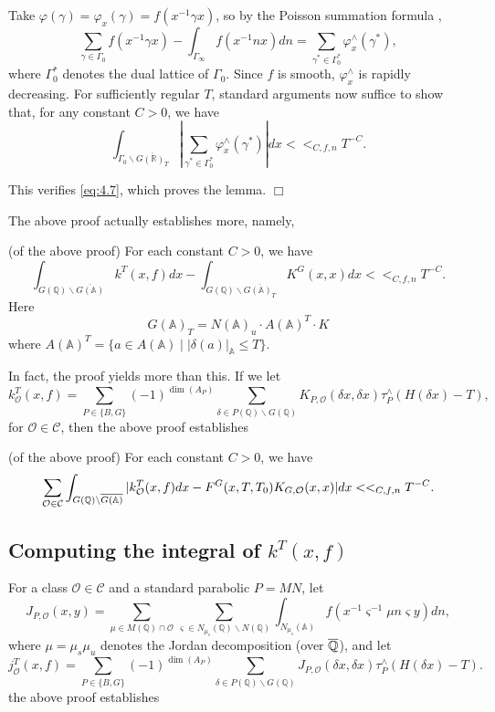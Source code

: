 Take $\varphi (\gamma )=\varphi _x(\gamma )=f(x^{-1}\gamma x)$, so by the
Poisson summation formula \cite{W1}, 
\[
\sum_{\gamma \in \Gamma _0}f(x^{-1}\gamma x)-\int_{\Gamma _\infty
}f(x^{-1}nx)dn=\sum_{\gamma ^{*}\in \Gamma _0^{*}}\varphi _x^{\wedge
}(\gamma ^{*}), 
\]
where $\Gamma _0^{*}$ denotes the dual lattice of $\Gamma _0$. Since $f$ is
smooth, $\varphi _x^{\wedge }$ is rapidly decreasing. For sufficiently
regular $T$, standard arguments now suffice to show that, for any constant $%
C>0$, we have 
\[
\int_{\Gamma _0\backslash \overline{G({\mathbb{R}})_T}}|\sum_{\gamma ^{*}\in
\Gamma _0^{*}}\varphi _x^{\wedge }(\gamma ^{*})|dx<<_{C,f,n}T^{-C}. 
\]

This verifies \eqref{eq:4.7}, which proves the lemma. $\Box $

The above proof actually establishes more, namely,

\begin{corollary}\label{cor:4.5}
(of the above proof) For each constant $C>0$, we have 
\[
\int_{G({\mathbb{Q}})\backslash \overline{G({\mathbb{A}})}}k^T(x,f)dx-\int_{G({\mathbb{Q}}%
)\backslash \overline{G({\mathbb{A}})_T}}K^G(x,x)dx<<_{C,f,n}T^{-C}. 
\]
Here 
\[
G({\mathbb{A}})_T=N({\mathbb{A}})_u\cdot A({\mathbb{A}})^T\cdot K 
\]
where $A({\mathbb{A}})^T=\{a\in A({\mathbb{A}})\;|\;|\delta (a)|_{\mathbb A}\leq T\}$.
\end{corollary}

In fact, the proof yields more than this. If we let 
\[
k_{{\mathcal{O}}}^T(x,f)=\sum_{P\in \{B,G\}}(-1)^{\dim (A_P)}\sum_{\delta \in
P({\mathbb{Q}})\backslash G({\mathbb{Q}})}K_{P,{\mathcal{O}}}(\delta x,\delta x)\tau
_P^{\wedge }(H(\delta x)-T), 
\]
for ${\mathcal{O}}\in {\mathcal{C}}$, then the above proof establishes

\begin{corollary}\label{cor:4.6}
(of the above proof) For each constant $C>0$, we have 
\[
\sum_{{\mathcal{O}}\in {\mathcal{C}}}\int_{G({\mathbb{Q}})\backslash \overline{G(\mathbb{%
A})}}|k_{{\mathcal{O}}}^T(x,f)dx-F^G(x,T,T_0)K_{G,{\mathcal{O}}%
}(x,x)|dx<<_{C,f,n}T^{-C}. 
\]
\end{corollary}

\subsection{Computing the integral of $k^T(x,f)$}

For a class ${\mathcal{O}}\in {\mathcal{C}}$ and a standard parabolic $P=MN$,
let 
\[
J_{P,{\mathcal{O}}}(x,y)=\sum_{\mu \in M({\mathbb{Q}})\cap {\mathcal{O}}%
}\sum_{\varsigma \in N_{\mu _s}({\mathbb{Q}})\backslash N({\mathbb{Q}})}\int_{N_{\mu
_s}({\mathbb{A}})}f(x^{-1}\varsigma ^{-1}\mu n\varsigma y)dn, 
\]
where $\mu =\mu _s\mu _u$ denotes the Jordan decomposition (over $\overline{%
{\mathbb{Q}}}$), and let 
\[
j_{{\mathcal{O}}}^T(x,f)=\sum_{P\in \{B,G\}}(-1)^{\dim (A_P)}\sum_{\delta \in
P({\mathbb{Q}})\backslash G({\mathbb{Q}})}J_{P,{\mathcal{O}}}(\delta x,\delta x)\tau
_P^{\wedge }(H(\delta x)-T). 
\]
the above proof establishes

